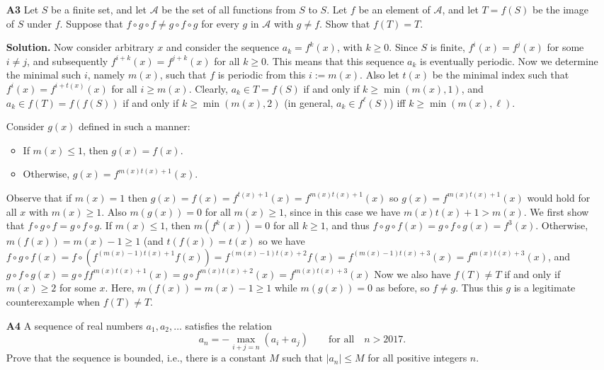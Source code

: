 \documentclass[11pt,a4paper]{article}
\begin{document}
\begin{enumerate}
	\item [\textbf{A3}] Let $S$ be a finite set, and let $\mathcal{A}$ be the set of all functions from $S$ to $S$. Let $f$ be an element of $\mathcal{A}$, and let $T=f(S)$ be the image of $S$ under $f$. Suppose that $f\circ g\circ f\ne g\circ f\circ g$ for every $g$ in $\mathcal{A}$ with $g\ne f$. Show that $f(T)=T$.
	
	\textbf{Solution.} Now consider arbitrary $x$ and consider the sequence $a_k=f^{k}(x)$, with $k\ge 0$. Since $S$ is finite, $f^{i}(x)=f^{j}(x)$ for some $i\neq j$, and subsequently $f^{i+k}(x)=f^{j+k}(x)$ for all $k\ge 0$. This means that this sequence $a_k$ is eventually periodic. Now we determine the minimal such $i$, namely $m(x)$, such that $f$ is periodic from this $i:=m(x)$. Also let $t(x)$ be the minimal index such that $f^{i}(x)=f^{i+t(x)}(x)$ for all $i\ge m(x)$. Clearly, $a_k\in T=f(S)$ if and only if $k\ge \min(m(x), 1)$, and $a_k\in f(T)=f(f(S))$ if and only if $k\ge\min(m(x), 2)$ (in general, $a_k\in f^{\ell}(S)$) iff $k\ge \min(m(x), \ell)$. 
	
	Consider $g(x)$ defined in such a manner: 
	\begin{itemize}
		\item If $m(x)\le 1$, then $g(x)=f(x)$. 
		\item Otherwise, $g(x)=f^{m(x)t(x)+1}(x)$. 
		\end{itemize}
	Observe that if $m(x)=1$ then $g(x)=f(x)=f^{t(x)+1}(x)=f^{m(x)t(x)+1}(x)$ so $g(x)=f^{m(x)t(x)+1}(x)$ would hold for all $x$ with $m(x)\ge 1$. Also $m(g(x))=0$ for all $m(x)\ge 1$, since in this case we have $m(x)t(x)+1>m(x)$. 
	We first show that $f\circ g\circ f=g\circ f\circ g$. If $m(x)\le 1$, then $m(f^{k}(x))=0$ for all $k\ge 1$, and thus $f\circ g\circ f(x)=g\circ f\circ g(x)=f^{3}(x)$. Otherwise, $m(f(x))=m(x)-1\ge 1$ (and $t(f(x))=t(x)$ so we have $f\circ g\circ f(x)=f\circ (f^{(m(x)-1)t(x)+1}f(x))=f^{(m(x)-1)t(x)+2}f(x)=f^{(m(x)-1)t(x)+3}(x)=f^{m(x)t(x)+3}(x)$, and 
	$g\circ f\circ g(x)=g\circ f f^{m(x)t(x)+1}(x) = g\circ f^{m(x)t(x)+2}(x)=f^{m(x)t(x)+3}(x)$
	Now we also have $f(T)\neq T$ if and only if $m(x)\ge 2$ for some $x$. Here, $m(f(x))=m(x)-1\ge 1$ while $m(g(x))=0$ as before, so $f\neq g$. Thus this $g$ is a legitimate counterexample when $f(T)\neq T$. 
	
	\item [\textbf{A4}] A sequence of real numbers $a_1,a_2,\dots$ satisfies the relation
	$$a_n=-\max_{i+j=n}(a_i+a_j)\qquad\text{for all}\quad n>2017.$$
	Prove that the sequence is bounded, i.e., there is a constant $M$ such that $|a_n|\leq M$ for all positive integers $n$.
	

\end{enumerate}
\end{document}
